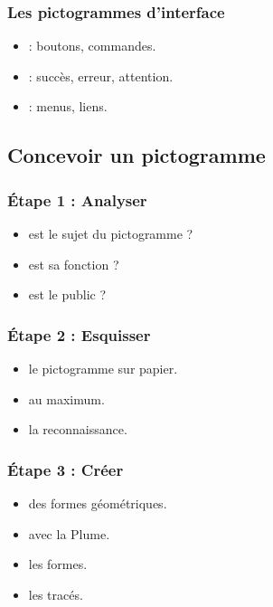\subsubsection{Les pictogrammes d'interface}

\begin{itemize}
    \item {} : boutons, commandes.
    \item {} : succès, erreur, attention.
    \item {} : menus, liens.
\end{itemize}

\subsection{Concevoir un pictogramme}

\subsubsection{Étape 1 : Analyser}

\begin{itemize}
    \item {} est le sujet du pictogramme ?
    \item {} est sa fonction ?
    \item {} est le public ?
\end{itemize}

\subsubsection{Étape 2 : Esquisser}

\begin{itemize}
    \item {} le pictogramme sur papier.
    \item {} au maximum.
    \item {} la reconnaissance.
\end{itemize}

\subsubsection{Étape 3 : Créer}

\begin{itemize}
    \item {} des formes géométriques.
    \item {} avec la Plume.
    \item {} les formes.
    \item {} les tracés.
\end{itemize}

